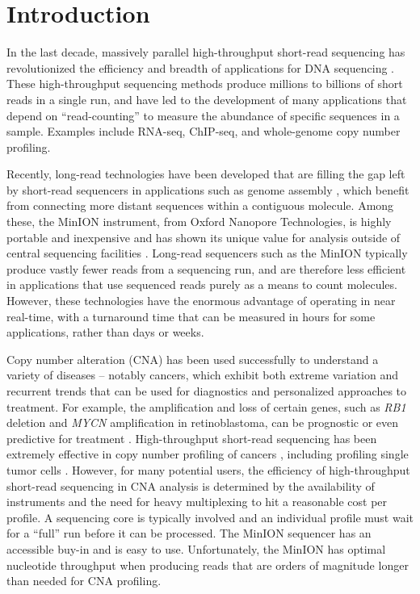 \chapter{Introduction}
\label{ch1}

In the last decade, massively parallel high-throughput short-read
sequencing has revolutionized the efficiency and breadth of applications
for DNA sequencing \citep{kircher2010high}.  These high-throughput
sequencing methods produce millions to billions of short reads in a
single run, and have led to the development of many applications that
depend on ``read-counting'' to measure the abundance of specific
sequences in a sample. Examples include RNA-seq, ChIP-seq, and
whole-genome copy number profiling.

Recently, long-read technologies have been developed that are filling
the gap left by short-read sequencers in applications such as genome
assembly \citep{jain2018nanopore,loman2015complete}, which benefit from
connecting more distant sequences within a contiguous molecule. Among
these, the MinION instrument, from Oxford Nanopore Technologies, is
highly portable and inexpensive and has shown its unique value for
analysis outside of central sequencing facilities \citep{quick2016real}.
Long-read sequencers such as the MinION typically produce vastly fewer
reads from a sequencing run, and are therefore less efficient in
applications that use sequenced reads purely as a means to count
molecules. However, these technologies have the enormous advantage of
operating in near real-time, with a turnaround time that can be measured
in hours for some applications, rather than days or weeks.

Copy number alteration (CNA) has been used successfully to understand a
variety of diseases \citep{fanciulli2010gene} -- notably cancers, which
exhibit both extreme variation and recurrent trends that can be used for
diagnostics and personalized approaches to treatment. For example, the
amplification and loss of certain genes, such as \textit{RB1} deletion
and \textit{MYCN} amplification in retinoblastoma, can be prognostic or
even predictive for treatment \citep{berry2017potential}.
High-throughput short-read sequencing has been extremely effective in
copy number profiling of cancers \citep{chiang2009high}, including
profiling single tumor cells \citep{navin2011tumour}. However, for many
potential users, the efficiency of high-throughput short-read sequencing
in CNA analysis is determined by the availability of instruments and the
need for heavy multiplexing to hit a reasonable cost per profile. A
sequencing core is typically involved and an individual profile must
wait for a ``full'' run before it can be processed. The MinION sequencer
has an accessible buy-in and is easy to use. Unfortunately, the MinION
has optimal nucleotide throughput when producing reads that are orders
of magnitude longer than needed for CNA profiling.

